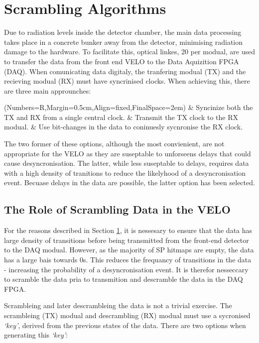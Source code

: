 \section{Scrambling Algorithms}
\label{sec:scrambling_algorithms}

	Due to radiation levels inside the detector chamber, the main data processing takes place in a concrete bunker away from the detector, minimising radiation damage to the hardware.
	To facilitate this, optical linkes, 20 per modual, are used to transfer the data from the front end VELO to the Data Aquizition FPGA (DAQ).
	When comunicating data digitaly, the tranfering modual (TX) and the recieving modual (RX) must have syncrinised clocks.
	When achieving this, there are three main approunches:

	\begin{easylist}
		\ListProperties(Numbers=R,Margin=0.5cm,Align=fixed,FinalSpace=2em)
		& Syncinize both the TX and RX from a single central clock.
		& Transmit the TX clock to the RX modual.
		& Use bit-changes in the data to coninuesly sycnronise the RX clock.
	\end{easylist}

	The two former of these options, although the most convienient, are not appropriate for the VELO as they are suseptable to unforseens delays that could cause desyncronisation.
	The latter, while less suseptable to delays, requires data with a high density of tranitions to reduce the likelyhood of a desyncronisation event.
	Becuase delays in the data are possible, the latter option has been selected.

	\subsection{The Role of Scrambling Data in the VELO}
		
		For the reasons described in Section \ref{sec:scrambling_algorithms}, it is nessesary to ensure that the data has large density of transitions before being transmitted from the front-end detector to the DAQ modual.
		However, as the majority of SP hitmaps are empty, the data has a large bais towards 0s.
		This reduces the frequancy of transitions in the data - increasing the probability of a desyncronisation event.
		It is therefor nesseccary to scramble the data pria to transmition and descramble the data in the DAQ FPGA.
		\par
		Scrambleing and later descrambleing the data is not a trivial exercise.
		The scrambleing (TX) modual and descrambling (RX) modual must use a sycronised \textit{`key'}, derived from the previous states of the data.
		There are two options when generating this \textit{`key'}:

